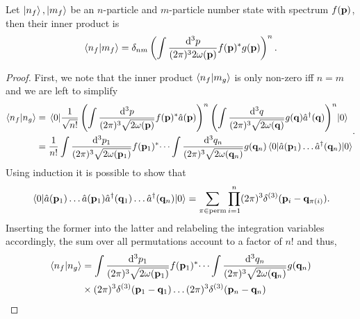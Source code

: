 \begin{theorem}\label{thm:qkg_number_state_inner_product}
	Let $\ket{n_f},\ket{m_f}$ be an $n$-particle and $m$-particle number state with spectrum $f(\vb{p})$, then their inner product is
	\begin{equation}
		\braket{n_f}{m_f}
		=
		\delta_{nm}
		\left(
			\int\frac{\dd[3]{p}}{(2\pi)^32\omega(\vb{p})}
			f(\vb{p})^*
			g(\vb{p})
		\right)^n
		.
	\end{equation}
\end{theorem}
\begin{proof}
	First, we note that the inner product $\braket{n_f}{m_g}$ is only non-zero iff $n=m$ and we are left to simplify
	\begin{equation*}
		\begin{split}
			\braket{n_f}{n_g}
			&=
			\expval{
				\frac{1}{\sqrt{n!}}
				\left(
					\int\frac{\dd[3]{p}}{(2\pi)^3\sqrt{2\omega(\vb{p})}}
					f(\vb{p})^*
					\hat{a}(\vb{p})
				\right)^n
				\left(
					\int\frac{\dd[3]{q}}{(2\pi)^3\sqrt{2\omega(\vb{q})}}
					g(\vb{q})
					\hat{a}^\dagger(\vb{q})
				\right)^n
			}{0}
			\\
			&=
			\frac{1}{n!}
			\int\frac{\dd[3]{p_1}}{(2\pi)^3\sqrt{2\omega(\vb{p}_1)}}
			f(\vb{p}_1)^*
			\dots
			\int\frac{\dd[3]{q_n}}{(2\pi)^3\sqrt{2\omega(\vb{q}_n)}}
			g(\vb{q}_n)
			\expval{
				\hat{a}(\vb{p}_1)
				\dots
				\hat{a}^\dagger(\vb{q}_n)
			}{0}
		\end{split}
		.
	\end{equation*}
	Using induction it is possible to show that
	\begin{equation*}
		\expval{
				\hat{a}(\vb{p}_1)
				\dots
				\hat{a}(\vb{p}_1)
				\hat{a}^\dagger(\vb{q}_1)
				\dots
				\hat{a}^\dagger(\vb{q}_n)
		}{0}
		=
		\sum_{\pi\in\textrm{perm}}
		\prod^n_{i=1}
		(2\pi)^3
		\delta^{(3)}(\vb{p}_i-\vb{q}_{\pi(i)})
		.
	\end{equation*}
	Inserting the former into the latter and relabeling the integration variables accordingly, the sum over all permutations account to a factor of $n!$ and thus,
	\begin{equation*}
		\begin{split}
			\braket{n_f}{n_g}
			&=
			\int\frac{\dd[3]{p_1}}{(2\pi)^3\sqrt{2\omega(\vb{p}_1)}}
			f(\vb{p}_1)^*
			\dots
			\int\frac{\dd[3]{q_n}}{(2\pi)^3\sqrt{2\omega(\vb{q}_n)}}
			g(\vb{q}_n)
			\\
			&\times
			(2\pi)^3
			\delta^{(3)}(\vb{p}_1-\vb{q}_1)
			\dots
			(2\pi)^3
			\delta^{(3)}(\vb{p}_n-\vb{q}_n)

\end{split}
\end{equation*}
\end{proof}
